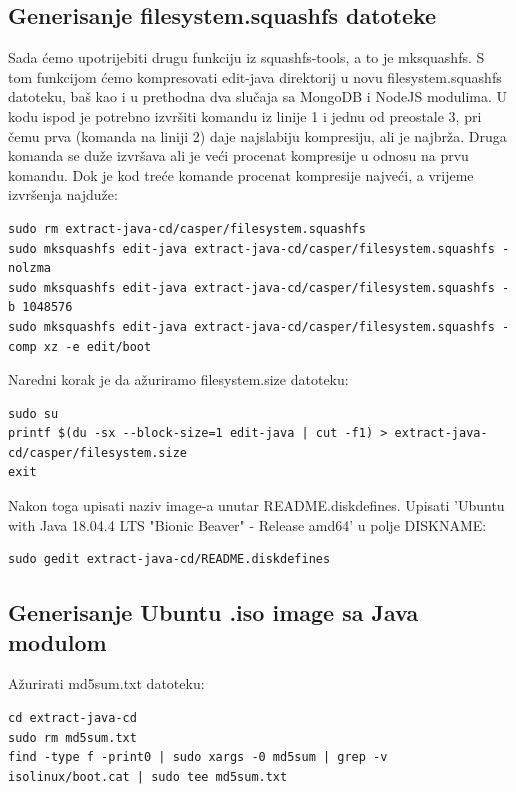 \documentclass[12pt,vi]{mitthesis}
\begin{document}
\subsection*{Generisanje filesystem.squashfs datoteke}
\noindent
Sada ćemo upotrijebiti drugu funkciju iz squashfs-tools, a to je mksquashfs. S tom funkcijom ćemo kompresovati edit-java direktorij u novu filesystem.squashfs datoteku, baš kao i u prethodna dva slučaja sa MongoDB i NodeJS modulima. U kodu ispod je potrebno izvršiti komandu iz linije 1 i jednu od preostale 3, pri čemu prva (komanda na liniji 2) daje najslabiju kompresiju, ali je najbrža. Druga komanda se duže izvršava ali je veći procenat kompresije u odnosu na prvu komandu. Dok je kod treće komande procenat kompresije najveći, a vrijeme izvršenja najduže:
\begin{lstlisting}[style=BashInputStyle]
sudo rm extract-java-cd/casper/filesystem.squashfs
sudo mksquashfs edit-java extract-java-cd/casper/filesystem.squashfs -nolzma 
sudo mksquashfs edit-java extract-java-cd/casper/filesystem.squashfs -b 1048576
sudo mksquashfs edit-java extract-java-cd/casper/filesystem.squashfs -comp xz -e edit/boot
\end{lstlisting}

\noindent
Naredni korak je da ažuriramo filesystem.size datoteku:
\begin{lstlisting}[style=BashInputStyle]
sudo su
printf $(du -sx --block-size=1 edit-java | cut -f1) > extract-java-cd/casper/filesystem.size
exit
\end{lstlisting}

\noindent
Nakon toga upisati naziv image-a unutar README.diskdefines. 
Upisati 'Ubuntu with Java 18.04.4 LTS "Bionic Beaver" - Release amd64' u polje DISKNAME:
\begin{lstlisting}[style=BashInputStyle]
sudo gedit extract-java-cd/README.diskdefines
\end{lstlisting}

\subsection*{Generisanje Ubuntu .iso image sa Java modulom}
\noindent
Ažurirati md5sum.txt datoteku:
\begin{lstlisting}[style=BashInputStyle]
cd extract-java-cd
sudo rm md5sum.txt
find -type f -print0 | sudo xargs -0 md5sum | grep -v isolinux/boot.cat | sudo tee md5sum.txt
\end{lstlisting}
\end{document}
